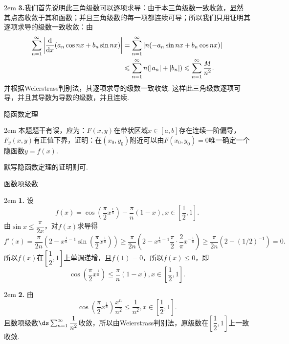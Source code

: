 \documentclass[UTF8,14pt,normal]{ctexart}
\begin{document}
    \hangindent 2em
    \noindent
    \textbf{3.}我们首先说明此三角级数可以逐项求导：由于本三角级数一致收敛，显然其点态收敛于其和函数；并且三角级数的每一项都连续可导；所以我们只用证明其逐项求导的级数一致收敛：由
    \begin{equation*}
        \begin{split}
            \sum_{n=1}^{\infty}\left\lvert\dv{x}(a_n\cos nx+b_n\sin nx)\right\rvert &= \sum_{n=1}^{\infty}|n(-a_n\sin nx+b_n\cos nx)|\\
            &\leqslant\sum_{n=1}^{\infty}n(|a_n|+|b_n|)\leqslant\sum_{n=1}^{\infty}\frac{M}{n^2}.
        \end{split}
    \end{equation*}
    并根据Weierstrass判别法，其逐项求导的级数一致收敛. 这样此三角级数逐项可导，并且其导数为导数的级数，并且连续.

\clearpage
{} 隐函数定理

    \hangindent 2em
    \noindent
    本题题干有误，应为：\(F(x,y)\)在带状区域\(x\in[a,b]\)存在连续一阶偏导，\(F_y(x,y)\)有正值下界，证明：在\((x_0,y_0)\)附近可以由\(F(x_0,y_0) = 0\)唯一确定一个隐函数\(y = f(x)\).

    默写隐函数定理的证明则可.

 函数项级数

    \hangindent 2em
    \noindent
    \textbf{1.}
    设\[f(x) = \cos(\dfrac{\pi}{2}x^{\frac{1}{n}}) - \dfrac{\pi}{n}(1-x), x\in\left[\frac{1}{2}, 1\right].\]
    由\(\sin x\leqslant \dfrac{\pi}{2 x}\)，对\(f(x)\)求导得\[f'(x) = \frac{\pi}{2n}\left(2-x^{\frac{1}{n}-1}\sin(\frac{\pi}{2}x^{\frac{1}{n}})\right)
    \geqslant\frac{\pi}{2n}\left(2-x^{\frac{1}{n}-1}\frac{\pi}{2}\cdot\frac{2}{\pi}x^{-\frac{1}{n}}\right)\geqslant\frac{\pi}{2n}(2-(1/2)^{-1}) = 0.\]
    所以\(f(x)\)在\(\left[\dfrac{1}{2}, 1\right]\)上单调递增，且\(f(1) = 0\)，所以\(f(x)\leqslant0\)，即\[\cos(\frac{\pi}{2}x^{\frac{1}{n}})\leqslant\frac{\pi}{n}(1-x), x\in\left[\dfrac{1}{2}, 1\right].\]

    \hangindent 2em
    \noindent
    \textbf{2.}
    由\[\cos(\frac{\pi}{2}x^{\frac{1}{n}})\frac{x^n}{n^2}\leqslant\frac{1}{n^2},x\in\left[\frac{1}{2},1\right].\]
    且数项级数\(\ds \sum_{n=1}^{\infty}\dfrac{1}{n^2}\)收敛，所以由Weierstrass判别法，原级数在\(\left[\dfrac{1}{2}, 1\right]\)上一致收敛.
\end{document}
